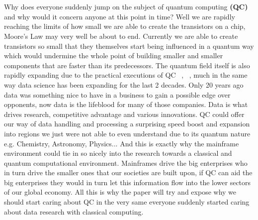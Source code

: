 
\chapter{}
\label{ch:inleiding}

Why does everyone suddenly jump on the subject of quantum computing \textbf{(QC)} and why would it concern anyone at this point in time? Well we are rapidly reaching the limits of how small we are able to create the transistors on a chip, Moore's Law may very well be about to end. Currently we are able to create transistors so small that they themselves start being influenced in a quantum way which would undermine the whole point of building smaller and smaller components that are faster than its predecessors. The quantum field itself is also rapidly expanding due to the practical executions of QC ~\textcite{Google2019}, ~\textcite{IBM2019}, much in the same way data science has been expanding for the last 2 decades. Only 20 years ago data was something nice to have in a business to gain a possible edge over opponents, now data is the lifeblood for many of those companies. Data is what drives research, competitive advantage and various innovations. QC could offer our way of data handling and processing a surprising speed boost and expansion into regions we just were not able to even understand due to its quantum nature e.g. Chemistry, Astronomy, Physics...  And this is exactly why the mainframe environment could tie in so nicely into the research towards a classical and quantum computational environment. Mainframes drive the big enterprises who in turn drive the smaller ones that our societies are built upon, if QC can aid the big enterprises they would in turn let this information flow into the lower sectors of our global economy. All this is why the paper will try and expose why we should start caring about QC in the very same everyone suddenly started caring about data research with classical computing.


\section{}
\label{sec:probleemstelling}

